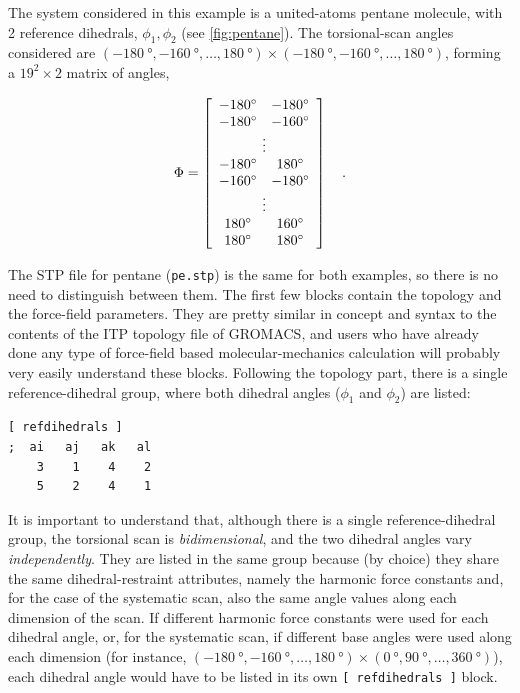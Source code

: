 \documentclass[10pt,a4paper,openany]{memoir}
\numberwithin{equation}{section}
\begin{document}
The system considered in this example is a united-atoms pentane
molecule, with 2 reference dihedrals, $\phi_1,\phi_2$ (see
\autoref{fig:pentane}). The torsional-scan angles considered are
$(\SI{-180}{\degree},\SI{-160}{\degree},\ldots,\SI{180}{\degree})
\times
(\SI{-180}{\degree},\SI{-160}{\degree},\ldots,\SI{180}{\degree})$,
forming a $19^2 \times 2$ matrix of angles,

\begin{align}\label{eq:tutorial-gen-matrix}
  \Phi = \left[
  \begin{array}{cc}
    \SI{-180}{\degree}&\SI{-180}{\degree} \\
    \SI{-180}{\degree}&\SI{-160}{\degree} \\
    \multicolumn{2}{c}{\vdots} \\
    \SI{-180}{\degree}&\SI{+180}{\degree} \\
    \SI{-160}{\degree}&\SI{-180}{\degree} \\
    \multicolumn{2}{c}{\vdots} \\
    \SI{+180}{\degree}&\SI{+160}{\degree} \\
    \SI{+180}{\degree}&\SI{+180}{\degree} \\
  \end{array}
  \right] \quad .
\end{align}

The STP file for pentane (\texttt{pe.stp}) is the same for both examples, so
there is no need to distinguish between them.
%
The first few blocks contain the topology and the force-field
parameters.
%
They are pretty similar in concept and syntax to the contents of the ITP
topology file of GROMACS, and users who have already done any type of
force-field based molecular-mechanics calculation will probably very easily
understand these blocks.
%
Following the topology part, there is a single reference-dihedral group,
where both dihedral angles ($\phi_1$ and $\phi_2$) are listed:

\begin{lstlisting}[language=gromacs]
[ refdihedrals ]
;  ai   aj   ak   al
    3    1    4    2
    5	 2    4	   1
\end{lstlisting}\vspace{2ex}\par

\noindent
It is important to understand that, although there is a single
reference-dihedral group, the torsional scan is \textit{bidimensional}, and the
two dihedral angles vary \textit{independently}.  They are listed in the same
group because (by choice) they share the same dihedral-restraint attributes,
namely the harmonic force constants and, for the case of the systematic scan,
also the same angle values along each dimension of the scan. If different
harmonic force constants were used for each dihedral angle, or, for the
systematic scan, if different base angles were used along each dimension (for
instance,
$(\SI{-180}{\degree},\SI{-160}{\degree},\ldots,\SI{180}{\degree}) \times
(\SI{0}{\degree},\SI{90}{\degree},\ldots,\SI{360}{\degree})$), each dihedral
angle would have to be listed in its own \texttt{[~refdihedrals~]} block.
%
\end{document}
